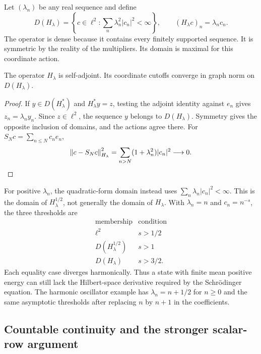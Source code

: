 Let $(\lambda_n)$ be any real sequence and define
\[
 D(H_\lambda)=\left\{c\in\ell^2:
       \sum_n\lambda_n^2|c_n|^2<\infty\right\},\qquad
 (H_\lambda c)_n=\lambda_nc_n.
\]
The operator is dense because it contains every finitely supported sequence. It is symmetric by the reality of the multipliers. Its domain is maximal for this coordinate action.

\begin{proposition}
The operator $H_\lambda$ is self-adjoint. Its coordinate cutoffs converge in graph norm on $D(H_\lambda)$.
\end{proposition}
\begin{proof}
If $y\in D(H_\lambda^*)$ and $H_\lambda^*y=z$, testing the adjoint identity against $e_n$ gives $z_n=\lambda_ny_n$. Since $z\in\ell^2$, the sequence $y$ belongs to $D(H_\lambda)$. Symmetry gives the opposite inclusion of domains, and the actions agree there. For $S_Nc=\sum_{n\leq N}c_ne_n$,
\[
 \left\lVert c-S_Nc\right\rVert_{H_\lambda}^2
 =\sum_{n>N}(1+\lambda_n^2)|c_n|^2\longrightarrow0.
\]
\end{proof}

For positive $\lambda_n$, the quadratic-form domain instead uses $\sum_n\lambda_n|c_n|^2<\infty$. This is the domain of $H_\lambda^{1/2}$, not generally the domain of $H_\lambda$. With $\lambda_n=n$ and $c_n=n^{-s}$, the three thresholds are
\[
 \begin{array}{c|c}
 \text{membership}&\text{condition}\\ \hline
 \ell^2&s>1/2\\
 D(H_\lambda^{1/2})&s>1\\
 D(H_\lambda)&s>3/2.
 \end{array}
\]
Each equality case diverges harmonically. Thus a state with finite mean positive energy can still lack the Hilbert-space derivative required by the Schr\"odinger equation. The harmonic oscillator example has $\lambda_n=n+1/2$ for $n\geq0$ and the same asymptotic thresholds after replacing $n$ by $n+1$ in the coefficients.


\subsection{Countable continuity and the stronger scalar-row argument}

